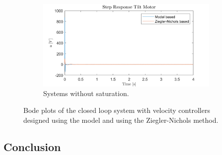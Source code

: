 \documentclass[../../main.tex]{subfiles}
\begin{document}
\begin{figure}[h]
\begin{subfigure}{0.48\textwidth}
    \includegraphics[width = 0.97\textwidth]{Sections/System_Design/Images/cascade_step_u_NoSat.png}
    \caption{Systems without saturation.}
    \label{fig:RL_cascade_NZ}
\end{subfigure}
\caption{Bode plots of the closed loop system with velocity controllers designed using the model and using the Ziegler-Nichols method.}
\label{fig:RL_cascade}
\end{figure}




\subsection{Conclusion}
\end{document}
